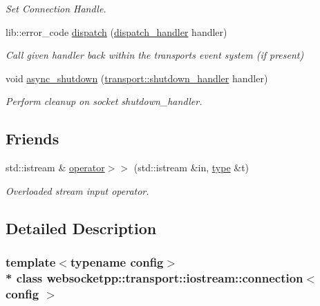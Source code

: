 \begin{DoxyCompactItemize}
\begin{DoxyCompactList}\small\item\em Set Connection Handle. \end{DoxyCompactList}\item 
lib\+::error\+\_\+code \hyperlink{classwebsocketpp_1_1transport_1_1iostream_1_1connection_a0c31a1546701021f547ae2f21126a473}{dispatch} (\hyperlink{namespacewebsocketpp_1_1transport_a6658447b2e10f4c712dd792aad0e0c78}{dispatch\+\_\+handler} handler)
\begin{DoxyCompactList}\small\item\em Call given handler back within the transport\textquotesingle{}s event system (if present) \end{DoxyCompactList}\item 
void \hyperlink{classwebsocketpp_1_1transport_1_1iostream_1_1connection_a2db617fadc96d53034eae1d0f3f1a68a}{async\+\_\+shutdown} (\hyperlink{namespacewebsocketpp_1_1transport_af39aff6fc4cb76f7df0d5322b734d156}{transport\+::shutdown\+\_\+handler} handler)
\begin{DoxyCompactList}\small\item\em Perform cleanup on socket shutdown\+\_\+handler. \end{DoxyCompactList}\end{DoxyCompactItemize}
\subsection*{Friends}
\begin{DoxyCompactItemize}
\item 
std\+::istream \& \hyperlink{classwebsocketpp_1_1transport_1_1iostream_1_1connection_abe774d57c24627dd991932f833041987}{operator$>$$>$} (std\+::istream \&in, \hyperlink{classwebsocketpp_1_1transport_1_1iostream_1_1connection_a39c8ef910236a223be66a8338962cb99}{type} \&t)
\begin{DoxyCompactList}\small\item\em Overloaded stream input operator. \end{DoxyCompactList}\end{DoxyCompactItemize}


\subsection{Detailed Description}
\subsubsection*{template$<$typename config$>$\\*
class websocketpp\+::transport\+::iostream\+::connection$<$ config $>$}



